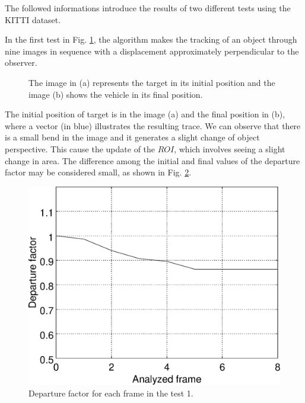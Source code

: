 The followed informations introduce the results of two different tests 
using the KITTI dataset\cite{Geiger}.


In the first test in Fig. \ref{fig:imgpapercerta}, 
the algorithm makes the tracking of an object through nine images in sequence with 
a displacement approximately perpendicular to the observer.
\begin{figure}[!hbt]
\centering
  \caption{The image in (a) represents the target in its initial position 
   and the image (b) shows the vehicle in its final position.}
  \label{fig:imgpapercerta}
\end{figure}
The initial position of target is in the image (a) and the final position in (b), 
where a vector (in blue) illustrates the resulting trace.
We can observe that there is a small bend in the image 
and it generates a slight change of object perspective. 
This cause the update of the $ROI$, which involves seeing a slight change in area.
The difference among the initial and final values of the departure factor may 
be considered small, as shown in Fig. \ref{fig:res_graph1}.
\begin{figure}[!hbt]
\centering
\includegraphics[width=0.8\columnwidth]{images/graph1.eps}
\caption{Departure factor for each frame in the test 1.}
\label{fig:res_graph1}
\end{figure}
